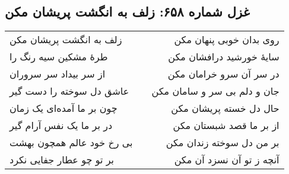 \begin{center}
\section*{غزل شماره ۶۵۸: زلف به انگشت پریشان مکن}
\label{sec:658}
\begin{longtable}{l p{0.5cm} r}
زلف به انگشت پریشان مکن
&&
روی بدان خوبی پنهان مکن
\\
طرهٔ مشکین سیه رنگ را
&&
سایهٔ خورشید درافشان مکن
\\
از سر بیداد سر سروران
&&
در سر آن سرو خرامان مکن
\\
عاشق دل سوخته را دست گیر
&&
جان و دلم بی سر و سامان مکن
\\
چون بر ما آمده‌ای یک زمان
&&
حال دل خسته پریشان مکن
\\
در بر ما یک نفس آرام گیر
&&
از بر ما قصد شبستان مکن
\\
بی رخ خود عالم همچون بهشت
&&
بر من دل سوخته زندان مکن
\\
بر تو چو عطار جفایی نکرد
&&
آنچه ز تو آن نسزد آن مکن
\\
\end{longtable}
\end{center}
